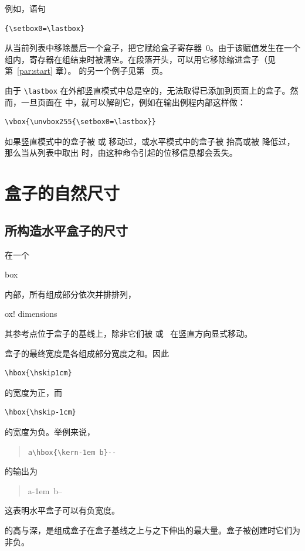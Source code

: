 \documentclass[a4paper]{rapport3}
\makeatletter
\newenvironment{disp}{\begin{quotation}}{\end{quotation}}
\def\term#1\par{\index{#1}}
\def\cstoidx#1\par{\index{#1@\cs{#1}}}
\def\csidx#1{\cstoidx #1\par\cs{#1}}
\makeatother
\begin{document}
例如，语句
\begin{verbatim}
{\setbox0=\lastbox}
\end{verbatim}
从当前列表中移除最后一个盒子，把它赋给盒子寄存器~0。由于该赋值发生在一个组内，寄存器在组结束时被清空。在段落开头，可以用它移除缩进盒子（见第~\ref{par:start} 章）。 的另一个例子见第~\pageref{varioset} 页。

由于 \verb-\lastbox- 在外部竖直模式中总是空的，无法取得已添加到页面上的盒子。然而，一旦页面在  中，就可以解剖它，例如在输出例程内部这样做：
\begin{verbatim}
\vbox{\unvbox255{\setbox0=\lastbox}}
\end{verbatim}

如果竖直模式中的盒子被  或  移动过，或水平模式中的盒子被  抬高或被  降低过，那么当从列表中取出  时，由这种命令引起的位移信息都会丢失。
\awp

\section{盒子的自然尺寸}

\subsection{所构造水平盒子的尺寸}

在一个 \csidx{hbox} 内部，所有组成部分依次并排排列，
\term box! dimensions\par
其参考点位于盒子的基线上，除非它们被  或~ 在竖直方向显式移动。

盒子的最终宽度是各组成部分宽度之和。因此
\begin{verbatim}
\hbox{\hskip1cm}
\end{verbatim}
的宽度为正，而
\begin{verbatim}
\hbox{\hskip-1cm}
\end{verbatim}
的宽度为负。举例来说，
\begin{disp}\verb>a\hbox{\kern-1em b}-->\end{disp}
的输出为
\begin{disp}\leavevmode\hphantom{b}a\hbox{\kern-1em b}--\end{disp}
这表明水平盒子可以有负宽度。

 的高与深，是组成盒子在盒子基线之上与之下伸出的最大量。盒子被创建时它们为非负。
\end{document}
